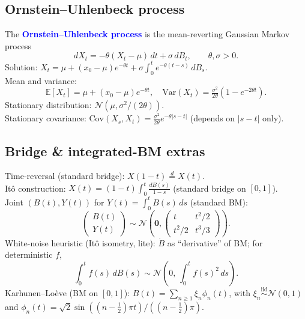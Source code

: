 \subsection{Ornstein--Uhlenbeck process}
The \textcolor{Blue}{\textbf{Ornstein--Uhlenbeck process}} is the mean-reverting
Gaussian Markov process
\[dX_t=-\theta(X_t-\mu)\,dt+\sigma\,dB_t,\qquad \theta,\sigma>0.\]
Solution: $X_t=\mu+(x_0-\mu)e^{-\theta t}+\sigma\!\int_0^t e^{-\theta(t-s)}\,dB_s$.\\
\textcolor{Bittersweet}{Mean and variance}:
\[\mathbb{E}[X_t]=\mu+(x_0-\mu)e^{-\theta t},\quad
\mathrm{Var}(X_t)=\tfrac{\sigma^2}{2\theta}(1-e^{-2\theta t}).\]
\textcolor{Bittersweet}{Stationary distribution}:
$\mathcal{N}(\mu,\sigma^2/(2\theta))$.\\
\textcolor{Bittersweet}{Stationary covariance}: $\mathrm{Cov}(X_s,X_t)=
\tfrac{\sigma^2}{2\theta}e^{-\theta|s-t|}$ (depends on $|s-t|$ only).

\subsection{Bridge \& integrated-BM extras}
\textcolor{Bittersweet}{Time-reversal} (standard bridge):
$X(1-t)\stackrel{d}{=}X(t)$.\\
\textcolor{Bittersweet}{It\^o construction}: $X(t)=(1-t)\!\int_0^t\!\frac{dB(s)}{1-s}$
(standard bridge on $[0,1]$).\\
\textcolor{Bittersweet}{Joint $(B(t),Y(t))$} for $Y(t)=\int_0^t B(s)\,ds$
(standard BM):
\[\begin{pmatrix}B(t)\\ Y(t)\end{pmatrix}\sim\mathcal{N}\!\left(\mathbf 0,
\begin{pmatrix}t & t^2/2\\ t^2/2 & t^3/3\end{pmatrix}\right).\]
\textcolor{Bittersweet}{White-noise heuristic} (It\^o isometry, lite): $\dot B$
as ``derivative'' of BM; for deterministic $f$,
\[\int_0^t f(s)\,dB(s)\sim\mathcal{N}\!\left(0,\,\int_0^t f(s)^2\,ds\right).\]
\textcolor{Bittersweet}{Karhunen--Lo\`eve (BM on $[0,1]$)}:
$B(t)=\sum_{n\ge 1}\xi_n\phi_n(t)$, with
$\xi_n\stackrel{\mathrm{iid}}{\sim}\mathcal{N}(0,1)$ and
$\phi_n(t)=\sqrt{2}\sin((n-\tfrac12)\pi t)/((n-\tfrac12)\pi)$.
